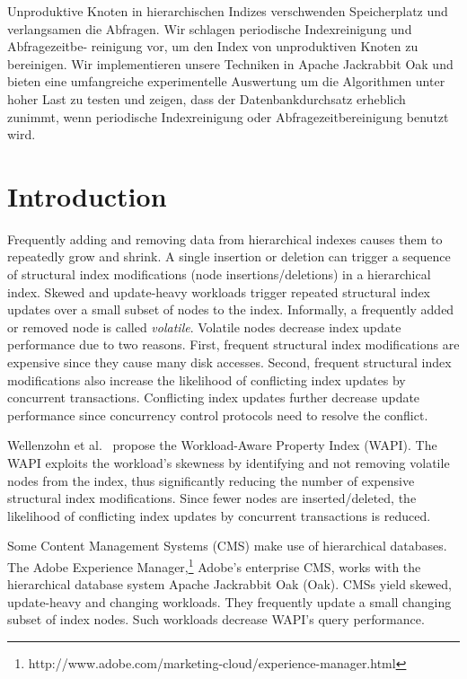 \documentclass[abstracton,12pt]{scrartcl}
\theoremstyle{definition}
\begin{document}
Unproduktive Knoten in hierarchischen Indizes verschwenden Speicherplatz und
verlangsamen die Abfragen. Wir schlagen periodische Indexreinigung
und Abfragezeitbe- reinigung vor, um den Index von unproduktiven Knoten zu
bereinigen. Wir implementieren
unsere Techniken in Apache Jackrabbit Oak und bieten eine umfangreiche
experimentelle Auswertung um die Algorithmen unter hoher Last zu testen und
zeigen, dass der Datenbankdurchsatz erheblich zunimmt, wenn periodische
Indexreinigung oder Abfragezeitbereinigung benutzt wird.

\newpage
\thispagestyle{empty}

\tableofcontents

\newpage
\thispagestyle{empty}

\listoffigures

\newpage

\newpage\null\thispagestyle{empty}\newpage

\section{Introduction}

Frequently adding and removing data from hierarchical indexes causes them to
repeatedly grow and shrink. A single insertion or deletion can trigger a
sequence of structural index modifications (node insertions/deletions) in a
hierarchical index. Skewed and update-heavy workloads trigger repeated
structural index updates over a small subset of nodes to the index.
Informally, a frequently added or removed node is called \textit{volatile}.
Volatile nodes decrease index update performance due to two reasons. First,
frequent structural index modifications are expensive since they cause many disk
accesses. Second, frequent structural index modifications also increase the
likelihood of conflicting index updates by concurrent transactions. Conflicting
index updates further decrease update performance since concurrency control
protocols need to resolve the conflict.

Wellenzohn et al.~\cite{KW17} propose the Workload-Aware Property Index (WAPI).
The WAPI exploits the workload's skewness by identifying and not removing
volatile nodes from the index, thus significantly reducing the number of
expensive structural index modifications. Since fewer nodes are
inserted/deleted, the likelihood of conflicting index updates by concurrent
transactions is reduced.

Some Content Management Systems (CMS) make use of hierarchical databases. The Adobe
Experience
Manager,\footnote{http://www.adobe.com/marketing-cloud/experience-manager.html}
Adobe's enterprise CMS, works with the hierarchical database system Apache
Jackrabbit Oak (Oak). CMSs yield skewed, update-heavy and changing
workloads. They frequently update a small changing subset of index nodes. Such
workloads decrease WAPI's query performance.
\end{document}

